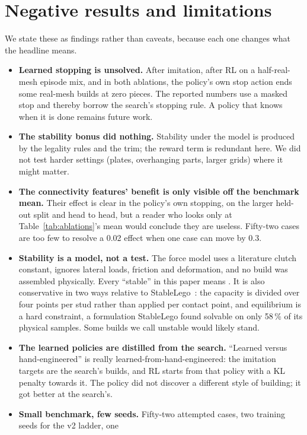 \section{Negative results and limitations}
\label{sec:limitations}

We state these as findings rather than caveats, because each one changes what the headline means.

\begin{itemize}
  \item \textbf{Learned stopping is unsolved.} After imitation, after RL on a half-real-mesh episode mix, and in
  both ablations, the policy's own stop action ends some real-mesh builds at zero pieces. The reported numbers use a
  masked stop and thereby borrow the search's stopping rule. A policy that knows when it is done remains future work.
  \item \textbf{The stability bonus did nothing.} Stability under the model is produced by the legality rules and the
  trim; the reward term is redundant here. We did not test harder settings (plates, overhanging parts, larger
  grids) where it might matter.
  \item \textbf{The connectivity features' benefit is only visible off the benchmark mean.} Their effect is clear in the
  policy's own stopping, on the larger held-out split and head to head, but a reader who looks only at
  Table~\ref{tab:ablations}'s mean would conclude they are useless. Fifty-two cases are too few to resolve a 0.02
  effect when one case can move by 0.3.
  \item \textbf{Stability is a model, not a test.} The force model uses a literature clutch constant, ignores lateral
  loads, friction and deformation, and no build was assembled physically. Every ``stable'' in this paper means
  \stablenote. It is also conservative in two ways relative to StableLego~\citep{liu2024stablelego}: the capacity is
  divided over four points per stud rather than applied per contact point, and equilibrium is a hard constraint,
  a formulation StableLego found solvable on only 58\,\% of its physical samples. Some builds we call unstable would
  likely stand.
  \item \textbf{The learned policies are distilled from the search.} ``Learned versus hand-engineered'' is really
  learned-from-hand-engineered: the imitation targets are the search's builds, and RL starts from that policy with a
  KL penalty towards it. The policy did not discover a different style of building; it got better at the search's.
  \item \textbf{Small benchmark, few seeds.} Fifty-two attempted cases, two training seeds for the v2 ladder, one

\end{itemize}
